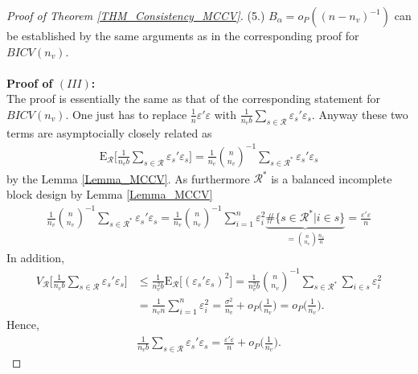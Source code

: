\documentclass[Research_Module_ES.tex]{subfiles}
\begin{document}
\begin{proof}[Proof of Theorem \ref{THM_Consistency_MCCV}]
	(5.)
	$B_{\alpha} = o_P((n-n_v)^{-1})$ can be established by the same arguments as in the corresponding proof for $BICV(n_v)$.\\\\
	\textbf{Proof of $(III)$:} \\
	The proof is essentially the same as that of the corresponding statement for $BICV(n_v)$. One just has to replace $\frac{1}{n}\varepsilon'\varepsilon$ with $\frac{1}{n_vb}\sum_{s\in \mathcal{R}}\varepsilon_s'\varepsilon_s$. Anyway these two terms are asymptocially closely related as
	\begin{align*}
	\mathrm{E}_\mathcal{R} \biggl[ \frac{1}{n_vb}\sum_{s\in \mathcal{R}}\varepsilon_s'\varepsilon_s\biggr] 
	=\frac{1}{n_v}\binom{n}{n_v}^{-1}\sum_{s\in \mathcal{R}^\ast}\varepsilon_s'\varepsilon_s
	\end{align*}
	by the Lemma \ref{Lemma_MCCV}. As furthermore $\mathcal{R}^\ast$ is a balanced incomplete block design by Lemma \ref{Lemma_MCCV} 
	\begin{align*}
	\frac{1}{n_v}\binom{n}{n_v}^{-1}\sum_{s\in \mathcal{R}^\ast}\varepsilon_s'\varepsilon_s
	= \frac{1}{n_v}\binom{n}{n_v}^{-1}\sum_{i=1}^n \varepsilon_i^2 \underbrace{\#\{s\in \mathcal{R}^\ast | i\in s\}}_{=\binom{n}{n_v}\frac{n_v}{n}}
	= \frac{\varepsilon'\varepsilon}{n}
	\end{align*}
	In addition,
	\begin{align*}
	V_\mathcal{R} \biggl[ \frac{1}{n_vb}\sum_{s\in \mathcal{R}}\varepsilon_s'\varepsilon_s\biggr]
	&\le \frac{1}{n_v^2b}\mathrm{E}_\mathcal{R} \bigl[(\varepsilon_s'\varepsilon_s)^2\bigr]
	= \frac{1}{n_v^2b}\binom{n}{n_v}^{-1}\sum_{s\in \mathcal{R}^\ast}\sum_{i\in s} \varepsilon_i^2\\
	&= \frac{1}{n_vn} \sum_{i=1}^n \varepsilon_i^2 
	= \frac{\sigma^2}{n_v} + o_P\biggl(\frac{1}{n_v}\biggr)
	= o_P\biggl(\frac{1}{n_v}\biggr).
	\end{align*}
	Hence, 
	\begin{align*}
	\frac{1}{n_vb}\sum_{s\in \mathcal{R}}\varepsilon_s'\varepsilon_s =\frac{\varepsilon'\varepsilon}{n} +o_P\biggl(\frac{1}{n_v}\biggr). 
	\end{align*}
\end{proof}
\end{document}
